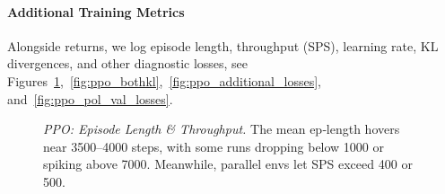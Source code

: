 \paragraph{Additional Training Metrics}
Alongside returns, we log episode length, throughput (SPS), learning rate, KL divergences, and other diagnostic losses, see Figures~\ref{fig:ppo_epilen_sps},~\ref{fig:ppo_bothkl},~\ref{fig:ppo_additional_losses}, and~\ref{fig:ppo_pol_val_losses}.

\begin{figure} 
	\centering
	\quad
	\caption{\emph{PPO: Episode Length \& Throughput.}
		The mean ep‐length hovers near 3500--4000 steps, 
		with some runs dropping below 1000 or spiking above 7000. 
		Meanwhile, parallel envs let SPS exceed 400 or 500.}
	\label{fig:ppo_epilen_sps}
\end{figure}

